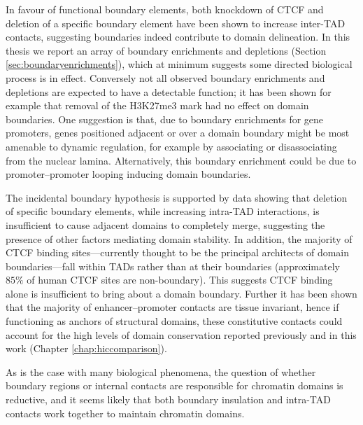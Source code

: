 \documentclass[a4paper,11pt,oneside]{book}
\begin{document}
In favour of functional boundary elements, both knockdown of CTCF\cite{Zuin2013} and deletion of a specific boundary element\cite{Nora2012} have been shown to increase inter-TAD contacts, suggesting boundaries indeed contribute to domain delineation. In this thesis we report an array of boundary enrichments and depletions (Section \ref{sec:boundaryenrichments}), which at minimum suggests some directed biological process is in effect. Conversely not all observed boundary enrichments and depletions are expected to have a detectable function; it has been shown for example that removal of the H3K27me3 mark had no effect on domain boundaries.\cite{Nora2012} One suggestion is that, due to boundary enrichments for gene promoters,\cite{Dixon2012} genes positioned adjacent or over a domain boundary might be most amenable to dynamic regulation, for example by associating or disassociating from the nuclear lamina. Alternatively, this boundary enrichment could be due to promoter--promoter looping inducing domain boundaries.\cite{Li2012a, Sanyal2012, Sexton2015}

The incidental boundary hypothesis is supported by data showing that deletion of specific boundary elements, while increasing intra-TAD interactions, is insufficient to cause adjacent domains to completely merge,\cite{Nora2012} suggesting the presence of other factors mediating domain stability. In addition, the majority of CTCF binding sites---currently thought to be the principal architects of domain boundaries---fall within TADs rather than at their boundaries (approximately $85\%$ of human CTCF sites are non-boundary\cite{Dixon2012}). This suggests CTCF binding alone is insufficient to bring about a domain boundary. Further it has been shown that the majority of enhancer--promoter contacts are tissue invariant,\cite{Bouwman2015a} hence if functioning as anchors of structural domains, these constitutive contacts could account for the high levels of domain conservation reported previously\cite{Lieberman2009, Dixon2012, Chambers2013, Rao2014} and in this work (Chapter \ref{chap:hiccomparison}).

As is the case with many biological phenomena, the question of whether boundary regions or internal contacts are responsible for chromatin domains is reductive, and it seems likely that both boundary insulation and intra-TAD contacts work together to maintain chromatin domains.
\end{document}
